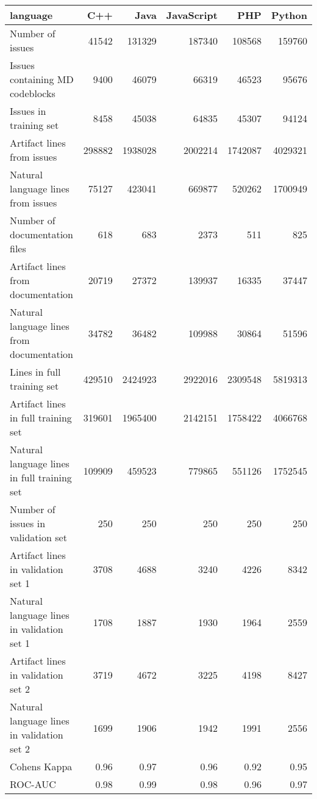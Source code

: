 \begin{tabular}{lrrrrr}
\toprule
language &       C++ &       Java &  JavaScript &        PHP &     Python \\
\midrule
Number of issues                            &  41542 &  131329 &   187340 &  108568 &  159760 \\
Issues containing MD codeblocks             &   9400 &   46079 &    66319 &   46523 &   95676 \\
Issues in training set                      &   8458 &   45038 &    64835 &   45307 &   94124 \\
Artifact lines from issues                  & 298882 & 1938028 &  2002214 & 1742087 & 4029321 \\
Natural language lines from issues          &  75127 &  423041 &   669877 &  520262 & 1700949 \\
Number of documentation files               &    618 &     683 &     2373 &     511 &     825 \\
Artifact lines from documentation           &  20719 &   27372 &   139937 &   16335 &   37447 \\
Natural language lines from documentation   &  34782 &   36482 &   109988 &   30864 &   51596 \\
Lines in full training set                  & 429510 & 2424923 &  2922016 & 2309548 & 5819313 \\
Artifact lines in full training set         & 319601 & 1965400 &  2142151 & 1758422 & 4066768 \\
Natural language lines in full training set & 109909 &  459523 &   779865 &  551126 & 1752545 \\
Number of issues in validation set          &    250 &     250 &      250 &     250 &     250 \\
Artifact lines in validation set 1          &   3708 &    4688 &     3240 &    4226 &    8342 \\
Natural language lines in validation set 1  &   1708 &    1887 &     1930 &    1964 &    2559 \\
Artifact lines in validation set 2          &   3719 &    4672 &     3225 &    4198 &    8427 \\
Natural language lines in validation set 2  &   1699 &    1906 &     1942 &    1991 &    2556 \\
Cohens Kappa                                &      0.96 &       0.97 &        0.96 &       0.92 &       0.95 \\
ROC-AUC                                     &      0.98 &       0.99 &        0.98 &       0.96 &       0.97 \\
\bottomrule
\end{tabular}
